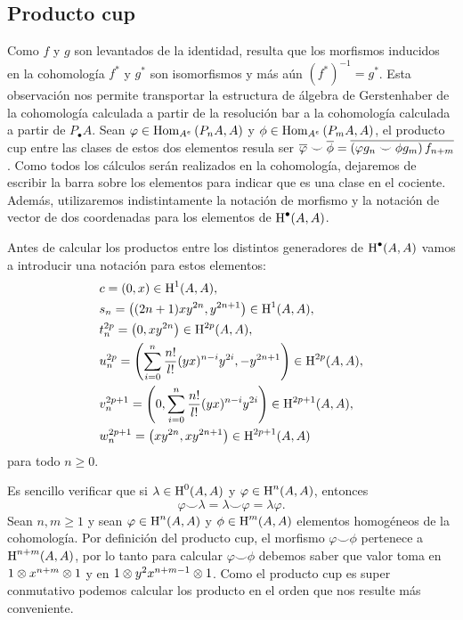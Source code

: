 \documentclass[fleqn,../tesis.tex]{subfiles}
\begin{document}
\subsection{Producto cup}
Como $f$ y $g$ son levantados de la identidad, resulta que los morfismos inducidos en la cohomología $f^{\ast}$
y $g^{\ast}$ son isomorfismos y más aún $\left(f^{\ast}\right)^{-1} = g^{\ast}$. Esta observación nos permite 
transportar la estructura de álgebra de Gerstenhaber de la cohomología calculada a partir de la resolución bar
a la cohomología calculada a partir de $P_{\bullet}A$. Sean $\varphi \in \operatorname{Hom}_{A^e}\left(P_n A, A\right)$
y $\phi \in \operatorname{Hom}_{A^e}\left(P_m A, A\right)$, el producto cup entre las clases de estos dos elementos
resula ser $\overline{\varphi} \smile \overline{\phi} = \overline{\left(\varphi g_n \smile \phi g_m\right) f_{n + m}}$.
Como todos los cálculos serán realizados en la cohomología, dejaremos de escribir la barra sobre los elementos
para indicar que es una clase en el cociente. Además, utilizaremos indistintamente la notación de morfismo
y la notación de vector de dos coordenadas para los elementos de $\operatorname{H}^{\bullet}(A, A)$.

Antes de calcular los productos entre los distintos generadores
de $\operatorname{H}^{\bullet}(A, A)$ vamos a introducir una notación para estos elementos:
\begin{align*}
	&c = \left(0,x\right) \in \operatorname{H}^1(A, A),\\
	&s_n = \left((2n + 1)xy^{2n}, y^{2n + 1}\right)\in \operatorname{H}^1(A, A),\\
	&t_n^{2p} = \left(0, xy^{2n}\right) \in 	\operatorname{H}^{2p}(A, A),\\
	&u_n^{2p} = \left(\sum_{i = 0}^{n}\frac{n!}{l!}(yx)^{n - i}y^{2i}, -y^{2n + 1}\right)
		\in 	\operatorname{H}^{2p}(A, A),\\
	&v_n^{2p + 1} = \left(0, \sum_{i = 0}^{n}\frac{n!}{l!}(yx)^{n - i}y^{2i}\right)
		\in 	\operatorname{H}^{2p + 1}(A, A),\\
	&w_n^{2p + 1} = \left(xy^{2n}, xy^{2n + 1}\right)
		\in 	\operatorname{H}^{2p + 1}(A, A)
\end{align*}
para todo $n \geq 0$. 

Es sencillo verificar que si $\lambda \in \operatorname{H}^{0}(A, A)$ y $\varphi \in \operatorname{H}^{n}(A, A)$,
entonces
\[
	\varphi \smile \lambda = \lambda \smile \varphi = \lambda \varphi.
\]
Sean $n, m \geq 1$
y sean $\varphi \in \operatorname{H}^{n}(A, A)$ y $\phi \in \operatorname{H}^{m}(A, A)$ elementos homogéneos de la cohomología.
Por definición del producto cup, el morfismo $\varphi \smile \phi$ pertenece a $\operatorname{H}^{n + m}(A, A)$,
por lo tanto para calcular $\varphi \smile \phi$ debemos saber que valor toma en $1\otimes x^{n + m} \otimes 1$
y en $1\otimes y^{2}x^{n + m -1}\otimes 1$. Como el producto cup es super conmutativo podemos
calcular los producto en el orden que nos resulte más conveniente.
\end{document}
